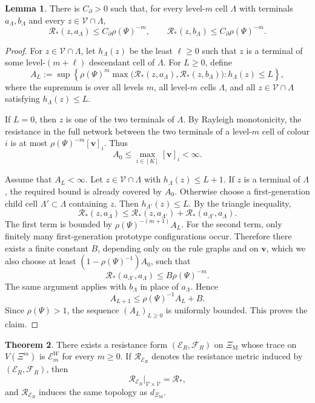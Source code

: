 \documentclass{article}
\DeclareRobustCommand{\revision}[1]{{\color{red}#1}}
\theoremstyle{plain}
\theoremstyle{definition}
\newtheorem{theorem}{Theorem}[section]
\newtheorem{lemma}[theorem]{Lemma}
\newcommand{\Reff}{\mathscr{R}}
\begin{document}
\begin{lemma}\label{lem:sec32_point_boundary}
There is $C_\partial>0$ such that, for every level-$m$ cell $\Lambda$ with terminals $a_{\Lambda},b_{\Lambda}$ and every $z\in\mathscr V\cap\Lambda$,
\[
\Reff_*(z,a_{\Lambda})\le C_\partial\rho(\Psi)^{-m},
\qquad
\Reff_*(z,b_{\Lambda})\le C_\partial\rho(\Psi)^{-m}.
\]
\end{lemma}

\begin{proof}
For $z\in\mathscr V\cap\Lambda$, let $h_{\Lambda}(z)$ be the least $\ell\ge 0$ such that $z$ is a terminal of some level-$(m+\ell)$ descendant cell of $\Lambda$.
For $L\ge 0$, define
\[
A_L:=
\sup
\left\{
\rho(\Psi)^m
\max\bigl(
\Reff_*(z,a_{\Lambda}),
\Reff_*(z,b_{\Lambda})
\bigr):
 h_{\Lambda}(z)\le L
\right\},
\]
where the supremum is over all levels $m$, all level-$m$ cells $\Lambda$, and all $z\in\mathscr V\cap\Lambda$ satisfying $h_{\Lambda}(z)\le L$.

If $L=0$, then $z$ is one of the two terminals of $\Lambda$.
\revision{By Rayleigh monotonicity, the resistance in the full network between the two terminals of a level-$m$ cell of colour $i$ is at most $\rho(\Psi)^{-m}[\mathbf v]_i$.}
Thus
\[
A_0\le \max_{i\in[K]}[\mathbf v]_i<\infty.
\]

Assume that $A_L<\infty$.
Let $z\in\mathscr V\cap\Lambda$ with $h_{\Lambda}(z)\le L+1$.
If $z$ is a terminal of $\Lambda$, the required bound is already covered by $A_0$.
Otherwise choose a first-generation child cell $\Lambda'\subset\Lambda$ containing $z$.
Then $h_{\Lambda'}(z)\le L$.
By the triangle inequality,
\[
\Reff_*(z,a_{\Lambda})
\le
\Reff_*(z,a_{\Lambda'})
+
\Reff_*(a_{\Lambda'},a_{\Lambda}).
\]
The first term is bounded by $\rho(\Psi)^{-(m+1)}A_L$.
For the second term, only finitely many first-generation prototype configurations occur.
\revision{Therefore there exists a finite constant $B$, depending only on the rule graphs and on $\mathbf v$, which we also choose at least $(1-\rho(\Psi)^{-1})A_0$, such that}
\[
\Reff_*(a_{\Lambda'},a_{\Lambda})\le B\rho(\Psi)^{-m}.
\]
The same argument applies with $b_{\Lambda}$ in place of $a_{\Lambda}$.
Hence
\[
A_{L+1}\le \rho(\Psi)^{-1}A_L+B.
\]
Since $\rho(\Psi)>1$, the sequence $(A_L)_{L\ge 0}$ is uniformly bounded.
This proves the claim.
\end{proof}

\begin{theorem}\label{thm:sec32_resistance_metric}
There exists a resistance form $(\mathcal E_R,\mathcal F_R)$ on $\Xi_{\mathrm M}$ whose trace on $V(\Xi^m)$ is $\mathcal E_m^W$ for every $m\ge 0$.
If $\Reff_{\mathcal E_R}$ denotes the resistance metric induced by $(\mathcal E_R,\mathcal F_R)$, then
\[
\Reff_{\mathcal E_R}|_{\mathscr V\times\mathscr V}=\Reff_*,
\]
and $\Reff_{\mathcal E_R}$ induces the same topology as $d_{\Xi_{\mathrm M}}$.
\end{theorem}
\end{document}
